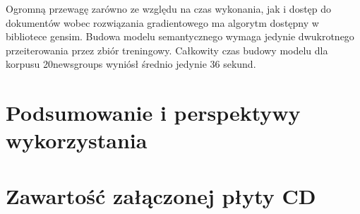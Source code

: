 \documentclass{pracamgr}
\begin{document}
Ogromną przewagę zarówno ze względu na czas wykonania, jak i dostęp do dokumentów wobec rozwiązania gradientowego ma algorytm dostępny w bibliotece gensim. Budowa modelu semantycznego wymaga jedynie dwukrotnego przeiterowania przez zbiór treningowy. Całkowity czas budowy modelu dla korpusu 20newsgroups wyniósł średnio jedynie 36 sekund. 

\chapter{Podsumowanie i perspektywy wykorzystania}

\appendix
\chapter{Zawartość załączonej płyty CD}

\begin{thebibliography}{99}


\end{thebibliography}
\end{document}
